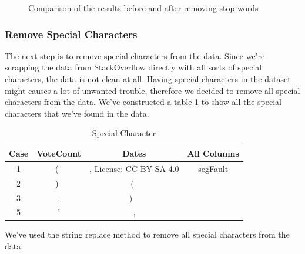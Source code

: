 \begin{figure}[H]
\caption{Comparison of the results before and after removing stop words }\label{stopwords_comparison}
\end{figure}

\subsubsection{Remove Special Characters}
The next step is to remove special characters from the data. Since we're scrapping the data from StackOverflow directly with all sorts of special characters, the data is not clean at all. Having special characters in the dataset might causes a lot of unwanted trouble, therefore we decided to remove all special characters from the data. We've constructed a table \ref{table:special_character} to show all the special characters that we've found in the data. 

\begin{table}[ht]
  \caption{Special Character} %
  \centering %
  \begin{tabular}{c c c c} %
  \hline\hline %
  Case & VoteCount & Dates & All Columns \\ [0.5ex] %
  \hline %
  1 & ( \, & , License: CC BY-SA 4.0 & segFault \\ %
  2 & ) \, & ( \, &  \\
  3 & , & ) \ &  \\
  5 & ' & , & \\ [1ex] %
  \hline %
  \end{tabular}
  \label{table:special_character} %
\end{table}

We've used the string replace method to remove all special characters from the data.

